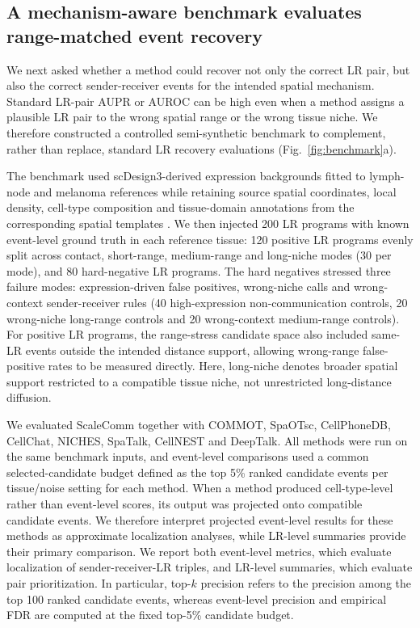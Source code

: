 \documentclass[referee,lineno,pdflatex,sn-vancouver-num]{sn-jnl}
\begin{document}
\subsection{A mechanism-aware benchmark evaluates range-matched event recovery}

We next asked whether a method could recover not only the correct LR pair, but also the correct sender-receiver events for the intended spatial mechanism. Standard LR-pair AUPR or AUROC can be high even when a method assigns a plausible LR pair to the wrong spatial range or the wrong tissue niche. We therefore constructed a controlled semi-synthetic benchmark to complement, rather than replace, standard LR recovery evaluations (Fig.~\ref{fig:benchmark}a).

The benchmark used scDesign3-derived expression backgrounds fitted to lymph-node and melanoma references while retaining source spatial coordinates, local density, cell-type composition and tissue-domain annotations from the corresponding spatial templates \citep{scdesign3}. We then injected 200 LR programs with known event-level ground truth in each reference tissue: 120 positive LR programs evenly split across contact, short-range, medium-range and long-niche modes (30 per mode), and 80 hard-negative LR programs. The hard negatives stressed three failure modes: expression-driven false positives, wrong-niche calls and wrong-context sender-receiver rules (40 high-expression non-communication controls, 20 wrong-niche long-range controls and 20 wrong-context medium-range controls). For positive LR programs, the range-stress candidate space also included same-LR events outside the intended distance support, allowing wrong-range false-positive rates to be measured directly. Here, long-niche denotes broader spatial support restricted to a compatible tissue niche, not unrestricted long-distance diffusion.

We evaluated ScaleComm together with COMMOT, SpaOTsc, CellPhoneDB, CellChat, NICHES, SpaTalk, CellNEST and DeepTalk. All methods were run on the same benchmark inputs, and event-level comparisons used a common selected-candidate budget defined as the top 5\% ranked candidate events per tissue/noise setting for each method. When a method produced cell-type-level rather than event-level scores, its output was projected onto compatible candidate events. We therefore interpret projected event-level results for these methods as approximate localization analyses, while LR-level summaries provide their primary comparison. We report both event-level metrics, which evaluate localization of sender-receiver-LR triples, and LR-level summaries, which evaluate pair prioritization. In particular, top-$k$ precision refers to the precision among the top 100 ranked candidate events, whereas event-level precision and empirical FDR are computed at the fixed top-5\% candidate budget.
\end{document}

